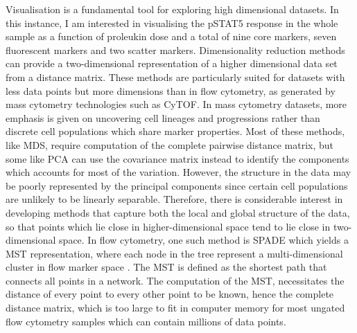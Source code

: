 Visualisation is a fundamental tool for exploring high dimensional datasets.
In this instance, I am interested in visualising the pSTAT5 response in the whole sample as a function of proleukin dose and a total of nine core markers, seven fluorescent markers and two scatter markers.
Dimensionality reduction methods can provide a two-dimensional representation of a higher dimensional data set from a distance matrix.
These methods are particularly suited for datasets with less data points but more dimensions than in flow cytometry,
as generated by mass cytometry technologies such as CyTOF.
In mass cytometry datasets, more emphasis is given on uncovering cell lineages and progressions rather than discrete cell populations which share marker
properties.
Most of these methods, like \gls{MDS}, require computation of the complete pairwise distance matrix,
but some like \gls{PCA} can use the covariance matrix instead to identify the components which accounts for most of the variation. 
However, the structure in the data may be poorly represented by the principal components since certain cell populations are unlikely to be linearly separable.
Therefore, there is considerable interest in developing methods that capture both the local and global structure of the data,
so that points which lie close in higher-dimensional space tend to lie close in two-dimensional space.
In flow cytometry, one such method is \acrfull{SPADE} which yields a \acrfull{MST} representation,
where each node in the tree represent a multi-dimensional cluster in flow marker space \citep{Simonds:2011jh}.
The \gls{MST} is defined as the shortest path that connects all points in a network.
The computation of the \gls{MST}, necessitates the distance of every point to every other point to be known, hence the complete distance matrix, which is too large to fit in computer memory for most ungated flow cytometry samples which can contain millions of data points.
